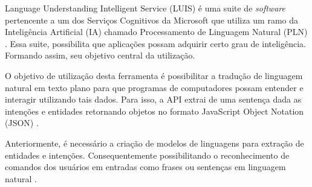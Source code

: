 Language Understanding Intelligent Service (LUIS) é uma suite de \textit{software} pertencente a um dos Serviços Cognitivos da Microsoft que utiliza um ramo da Inteligência Artificial (IA) chamado Processamento de Linguagem Natural (PLN) \cite{Mayo:2017}. Essa suite, possibilita que aplicações possam adquirir certo grau de inteligência. Formando assim, seu objetivo central da utilização.

O objetivo de utilização desta ferramenta é possibilitar a tradução de linguagem natural em texto plano para que programas de computadores possam entender e interagir utilizando tais dados. Para isso, a API extrai de uma sentença dada as intenções e entidades retornando objetos no formato JavaScript Object Notation (JSON) \cite{Mayo:2017}.

Anteriormente, é necessário a criação de modelos de linguagens para extração de entidades e intenções. Consequentemente possibilitando o reconhecimento de comandos dos usuários em entradas como frases ou sentenças em linguagem natural \cite{Larsen:2017}.
